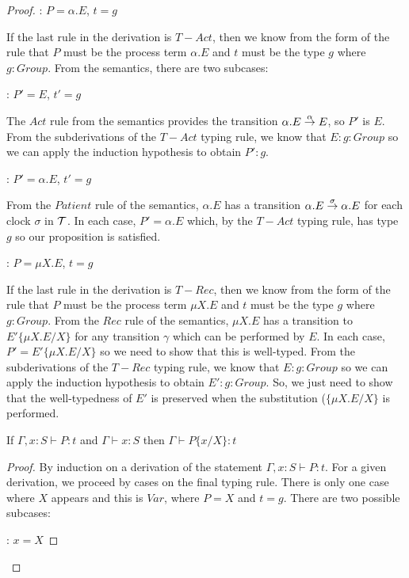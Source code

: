 \begin{proof}
: $P = \alpha.E$, $t = g$

\noindent If the last rule in the derivation is $T-Act$, then we know
from the form of the rule that $P$ must be the process term
$\alpha.E$ and $t$ must be the type $g$ where $g : Group$.  From
the semantics, there are two subcases:

: $P' = E$, $t' = g$

\noindent The $Act$ rule from the semantics provides the transition
$\alpha.E \stackrel{\alpha}{\rightarrow} E$, so $P'$ is $E$.  From the
subderivations of the $T-Act$ typing rule, we know that $E : g :
Group$ so we can apply the induction hypothesis to obtain $P' : g$.

: $P' = \alpha.E$, $t' = g$

\noindent From the $Patient$ rule of the semantics, $\alpha.E$ has a transition
$\alpha.E \stackrel{\sigma}{\rightarrow} \alpha.E$ for each clock $\sigma$ in
$\text{$\mathcal{T}$}$.  In each case, $P' = \alpha.E$ which, by the $T-Act$ typing
rule, has type $g$ so our proposition is satisfied.

: $P = \mu X.E$, $t = g$

\noindent If the last rule in the derivation is $T-Rec$, then we know
from the form of the rule that $P$ must be the process term $\mu X.E$
and $t$ must be the type $g$ where $g : Group$.  From the $Rec$ rule
of the semantics, $\mu X.E$ has a transition to $E'\{\mu X.E/X\}$ for
any transition $\gamma$ which can be performed by $E$.  In each case,
$P' = E'\{\mu X.E/X\}$ so we need to show that this is well-typed.
From the subderivations of the $T-Rec$ typing rule, we know that $E :
g : Group$ so we can apply the induction hypothesis to obtain $E' : g
: Group$.  So, we just need to show that the well-typedness of $E'$ is
preserved when the substitution ($\{\mu X.E/X\}$ is performed.

\begin{lemma}
If $\Gamma, x : S \vdash P : t$ and $\Gamma \vdash x : S$ then $\Gamma \vdash P\{x/X\} : t$
\end{lemma}

\begin{proof}
By induction on a derivation of the statement $\Gamma, x : S \vdash P
: t$.  For a given derivation, we proceed by cases on the final typing
rule.  There is only one case where $X$ appears and this is $Var$,
where $P = X$ and $t = g$.  There are two possible subcases:

: $x = X$


\end{proof}
\end{proof}
